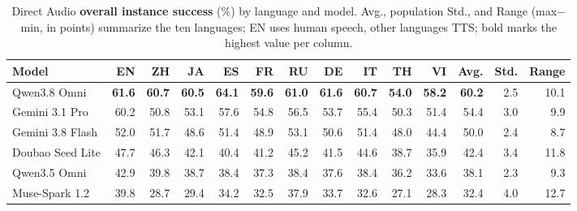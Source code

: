 \begin{table}[htbp]
\centering
\caption{Direct Audio \textbf{overall instance success} (\%) by language and model. Avg., population Std., and Range (max$-$min, in points) summarize the ten languages; EN uses human speech, other languages TTS; bold marks the highest value per column.}
\label{tab:performance_overview}
\begingroup
\fontsize{8.0}{10.0}\selectfont
\setlength{\tabcolsep}{1pt}
\renewcommand{\arraystretch}{1.06}
\begin{tabular*}{\linewidth}{@{}l@{\hspace{5pt}}|@{\hspace{5pt}\extracolsep{\fill}}*{10}{r}@{\hspace{5pt}}|@{\hspace{5pt}\extracolsep{\fill}}rrr@{}}
\toprule
\textbf{Model} & \textbf{EN} & \textbf{ZH} & \textbf{JA} & \textbf{ES} & \textbf{FR} & \textbf{RU} & \textbf{DE} & \textbf{IT} & \textbf{TH} & \textbf{VI} & \textbf{Avg.} & \textbf{Std.} & \textbf{Range} \\
\midrule
Qwen3.8 Omni & \textbf{61.6} & \textbf{60.7} & \textbf{60.5} & \textbf{64.1} & \textbf{59.6} & \textbf{61.0} & \textbf{61.6} & \textbf{60.7} & \textbf{54.0} & \textbf{58.2} & \textbf{60.2} & 2.5 & 10.1 \\
Gemini 3.1 Pro & 60.2 & 50.8 & 53.1 & 57.6 & 54.8 & 56.5 & 53.7 & 55.4 & 50.3 & 51.4 & 54.4 & 3.0 & 9.9 \\
Gemini 3.8 Flash & 52.0 & 51.7 & 48.6 & 51.4 & 48.9 & 53.1 & 50.6 & 51.4 & 48.0 & 44.4 & 50.0 & 2.4 & 8.7 \\
Doubao Seed Lite & 47.7 & 46.3 & 42.1 & 40.4 & 41.2 & 45.2 & 41.5 & 44.6 & 38.7 & 35.9 & 42.4 & 3.4 & 11.8 \\
Qwen3.5 Omni & 42.9 & 39.8 & 38.7 & 38.4 & 37.3 & 38.4 & 37.6 & 38.4 & 36.2 & 33.6 & 38.1 & 2.3 & 9.3 \\
Muse-Spark 1.2 & 39.8 & 28.7 & 29.4 & 34.2 & 32.5 & 37.9 & 33.7 & 32.6 & 27.1 & 28.3 & 32.4 & 4.0 & 12.7 \\
\bottomrule
\end{tabular*}
\endgroup
\end{table}
